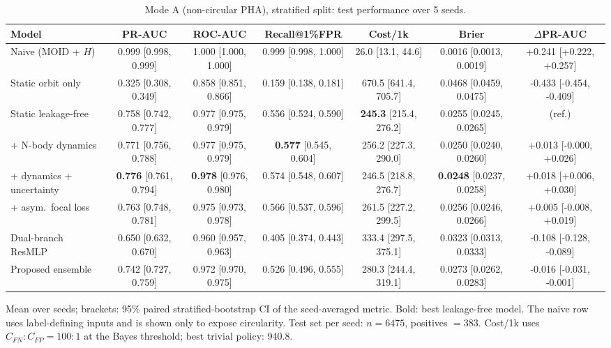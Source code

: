 \begin{table}[t]
\centering
\small
\caption{Mode A (non-circular PHA), stratified split: test performance over 5 seeds.}
\label{tab:pha_stratified_all}
\begin{tabular}{lcccccc}
\toprule
Model & PR-AUC & ROC-AUC & Recall@1\%FPR & Cost/1k & Brier & $\Delta$PR-AUC \\
\midrule
Naive (MOID + $H$) & 0.999 \scriptsize{[0.998, 0.999]} & 1.000 \scriptsize{[1.000, 1.000]} & 0.999 \scriptsize{[0.998, 1.000]} & 26.0 \scriptsize{[13.1, 44.6]} & 0.0016 \scriptsize{[0.0013, 0.0019]} & +0.241 \scriptsize{[+0.222, +0.257]} \\
\midrule
Static orbit only & 0.325 \scriptsize{[0.308, 0.349]} & 0.858 \scriptsize{[0.851, 0.866]} & 0.159 \scriptsize{[0.138, 0.181]} & 670.5 \scriptsize{[641.4, 705.7]} & 0.0468 \scriptsize{[0.0459, 0.0475]} & -0.433 \scriptsize{[-0.454, -0.409]} \\
Static leakage-free & 0.758 \scriptsize{[0.742, 0.777]} & 0.977 \scriptsize{[0.975, 0.979]} & 0.556 \scriptsize{[0.524, 0.590]} & \textbf{245.3} \scriptsize{[215.4, 276.2]} & 0.0255 \scriptsize{[0.0245, 0.0265]} & (ref.) \\
+ N-body dynamics & 0.771 \scriptsize{[0.756, 0.788]} & 0.977 \scriptsize{[0.975, 0.979]} & \textbf{0.577} \scriptsize{[0.545, 0.604]} & 256.2 \scriptsize{[227.3, 290.0]} & 0.0250 \scriptsize{[0.0240, 0.0260]} & +0.013 \scriptsize{[-0.000, +0.026]} \\
+ dynamics + uncertainty & \textbf{0.776} \scriptsize{[0.761, 0.794]} & \textbf{0.978} \scriptsize{[0.976, 0.980]} & 0.574 \scriptsize{[0.548, 0.607]} & 246.5 \scriptsize{[218.8, 276.7]} & \textbf{0.0248} \scriptsize{[0.0237, 0.0258]} & +0.018 \scriptsize{[+0.006, +0.030]} \\
+ asym.\ focal loss & 0.763 \scriptsize{[0.748, 0.781]} & 0.975 \scriptsize{[0.973, 0.978]} & 0.566 \scriptsize{[0.537, 0.596]} & 261.5 \scriptsize{[227.2, 299.5]} & 0.0256 \scriptsize{[0.0246, 0.0266]} & +0.005 \scriptsize{[-0.008, +0.019]} \\
Dual-branch ResMLP & 0.650 \scriptsize{[0.632, 0.670]} & 0.960 \scriptsize{[0.957, 0.963]} & 0.405 \scriptsize{[0.374, 0.443]} & 333.4 \scriptsize{[297.5, 375.1]} & 0.0323 \scriptsize{[0.0313, 0.0333]} & -0.108 \scriptsize{[-0.128, -0.089]} \\
Proposed ensemble & 0.742 \scriptsize{[0.727, 0.759]} & 0.972 \scriptsize{[0.970, 0.975]} & 0.526 \scriptsize{[0.496, 0.555]} & 280.3 \scriptsize{[244.4, 319.1]} & 0.0273 \scriptsize{[0.0262, 0.0283]} & -0.016 \scriptsize{[-0.031, -0.001]} \\
\bottomrule
\end{tabular}
\par\vspace{2pt}\footnotesize Mean over seeds; brackets: 95\% paired stratified-bootstrap CI of the seed-averaged metric. Bold: best leakage-free model. The naive row uses label-defining inputs and is shown only to expose circularity. Test set per seed: $n=6475$, positives $=383$. Cost/1k uses $C_{FN}{:}C_{FP}=100{:}1$ at the Bayes threshold; best trivial policy: 940.8.
\end{table}
